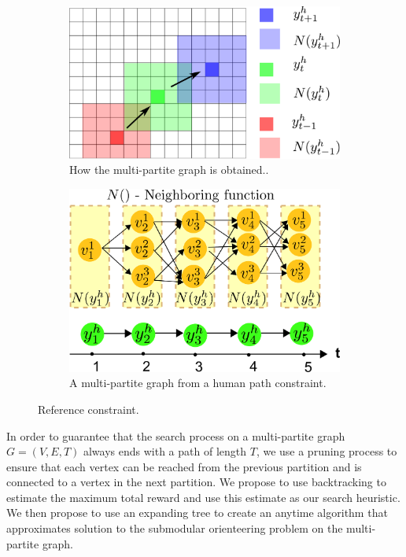 \documentclass[phd]{byuprop}
\begin{document}
\begin{figure}[htbp]
	\centering
	\begin{subfigure}[t]{0.45\linewidth}
		\centering
		\includegraphics[width=\textwidth]{fig/humanConstraint.pdf}
		\caption{How the multi-partite graph is obtained..}
		\label{fig:humanConstraint}
	\end{subfigure}  
	\begin{subfigure}[t]{0.45\linewidth}
		\centering
		\includegraphics[width=\textwidth]{fig/MultiPartite.pdf}
		\caption{A multi-partite graph from a human path constraint.}
		\label{fig:MultiPartite}
	\end{subfigure}   
	\caption{Reference constraint.}
	\label{fig:reference_constraint}
\end{figure}

In order to guarantee that the search process on a multi-partite graph $ G = (V, E, T) $ always ends with a path of length $ T $, we use a pruning process to ensure that each vertex can be reached from the previous partition and is connected to a vertex in the next partition.
We propose to use backtracking to estimate the maximum total reward and use this estimate as our search heuristic.
We then propose to use an expanding tree to create an anytime algorithm that approximates solution to the submodular orienteering problem on the multi-partite graph.
\end{document}
